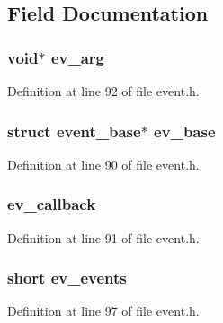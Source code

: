 \subsection{\-Field \-Documentation}
\hypertarget{structevent_a680e2f70d6e4ce56b58f57e1182ffac1}{
\subsubsection[{ev\-\_\-arg}]{\setlength{\rightskip}{0pt plus 5cm}void$\ast$ {\bf ev\-\_\-arg}}}\label{structevent_a680e2f70d6e4ce56b58f57e1182ffac1}


\-Definition at line 92 of file event.\-h.

\hypertarget{structevent_a79005f93f769baaa5ab5d2a45b52ec62}{
\subsubsection[{ev\-\_\-base}]{\setlength{\rightskip}{0pt plus 5cm}struct {\bf event\-\_\-base}$\ast$ {\bf ev\-\_\-base}}}\label{structevent_a79005f93f769baaa5ab5d2a45b52ec62}


\-Definition at line 90 of file event.\-h.

\hypertarget{structevent_a420d7cc7bf56d48aeeb1e27b52d7c829}{
\subsubsection[{ev\-\_\-callback}]{ {\bf ev\-\_\-callback}}}\label{structevent_a420d7cc7bf56d48aeeb1e27b52d7c829}


\-Definition at line 91 of file event.\-h.

\hypertarget{structevent_a1c8a838880f1938d9ea23dcfee0419ea}{
\subsubsection[{ev\-\_\-events}]{\setlength{\rightskip}{0pt plus 5cm}short {\bf ev\-\_\-events}}}\label{structevent_a1c8a838880f1938d9ea23dcfee0419ea}


\-Definition at line 97 of file event.\-h.

